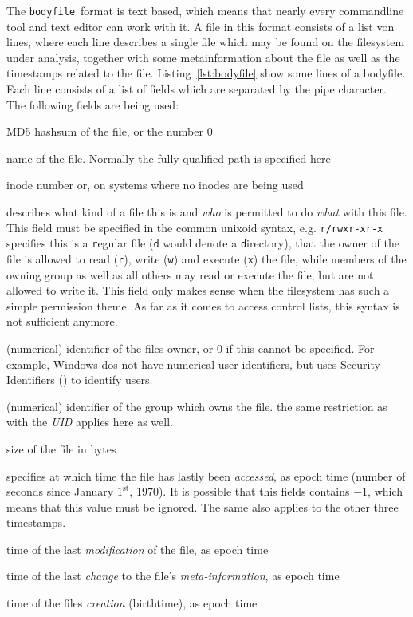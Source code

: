 \documentclass[twocolumn]{article}
\newcommand{\bodyfile}{\texttt{bodyfile}}
\begin{document}
The \bodyfile\ format is text based, which means that nearly every commandline tool and text editor can work with it. A file in this format consists of a list von lines, where each line describes a single file which may be found on the filesystem under analysis, together with some metainformation about the file as well as the timestamps related to the file. Listing~\ref{lst:bodyfile} show some lines of a bodyfile. Each line consists of a list of fields which are separated by the pipe character. The following fields are being used:

\begin{description}[font=\ttfamily]
\item[MD5] MD5 hashsum of the file, or the number $0$
\item[name] name of the file. Normally the fully qualified path is specified here
\item[inode] inode number or, on systems where no inodes are being used
\item[mode] describes what kind of a file this is and \emph{who} is permitted to do \emph{what} with this file. This field must be specified in the common unixoid syntax, e.g. \texttt{r/rwxr-xr-x} specifies this is a \texttt{r}egular file (\texttt{d} would denote a \texttt{d}irectory), that the owner of the file is allowed to read (\texttt{r}), write (\texttt{w}) and execute (\texttt{x}) the file, while members of the owning group as well as all others may read or execute the file, but are not allowed to write it. This field only makes sense when the filesystem has such a simple permission theme. As far as it comes to access control lists, this syntax is not sufficient anymore.
\item[UID] (numerical) identifier of the files owner, or $0$ if this cannot be specified. For example, Windows dos not have numerical user identifiers, but uses Security Identifiers (\cite{SecurityIdentifiers}) to identify users.
\item[GID] (numerical) identifier of the group which owns the file. the same restriction as with the \emph{UID} applies here as well.
\item[size] size of the file in bytes
\item[atime] specifies at which time the file has lastly been \emph{accessed}, as epoch time (number of seconds since January $1^\text{st}$, 1970). It is possible that this fields contains $-1$, which means that this value must be ignored. The same also applies to the other three timestamps.
\item[mtime] time of the last \emph{modification} of the file, as epoch time
\item[ctime] time of the last \emph{change} to the file's \emph{meta-information}, as epoch time
\item[crtime] time of the files \emph{creation} (birthtime), as epoch time
\end{description}
\end{document}
